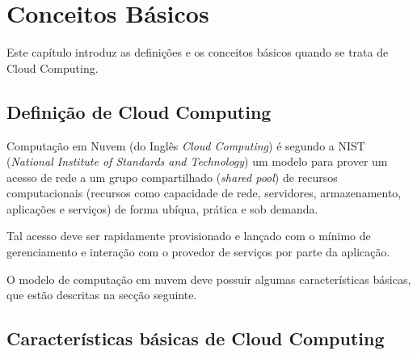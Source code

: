 \chapter{Conceitos Básicos}

Este capítulo introduz as definições e os conceitos básicos quando se trata de Cloud Computing.

\section{Definição de Cloud Computing}

Computação em Nuvem (do Inglês \textit{Cloud Computing}) é segundo a NIST (\textit{National Institute of Standards and Technology}) um modelo para prover um acesso de rede a um grupo compartilhado (\textit{shared pool}) de recursos computacionais (recursos como capacidade de rede, servidores, armazenamento, aplicações e serviços) de forma ubíqua, prática e sob demanda.

Tal acesso deve ser rapidamente provisionado e lançado com o mínimo de gerenciamento e interação com o provedor de serviços por parte da aplicação.

O modelo de computação em nuvem deve possuir algumas características básicas, que estão descritas na secção seguinte.

\section{Características básicas de Cloud Computing}

